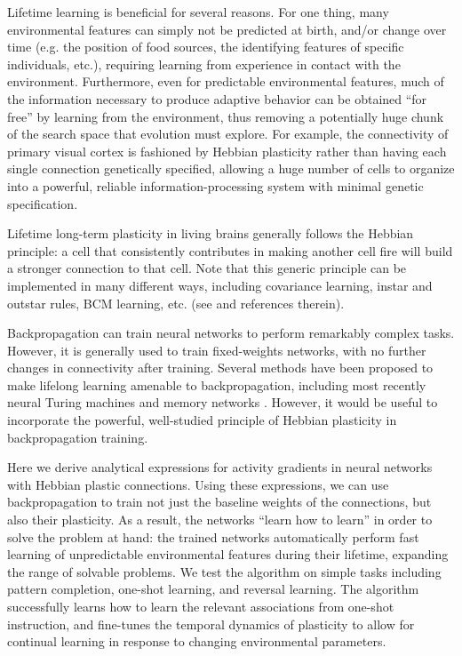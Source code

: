 \documentclass{article}
\begin{document}
Lifetime learning is beneficial for several reasons. For one thing,
many environmental features can simply not be predicted at birth, and/or change
over time (e.g. the
position of food sources, the identifying features of specific individuals, etc.), 
requiring learning from experience in contact with the
environment. Furthermore, even for predictable environmental features, much of
the information necessary to produce adaptive behavior can be obtained ``for
free'' by learning from the environment, thus removing a potentially huge chunk
of the search space that evolution must explore. For example, the connectivity
of primary visual cortex is fashioned by Hebbian plasticity rather than having
each single connection genetically specified, allowing a huge number of cells
to organize into a powerful, reliable information-processing system with
minimal genetic specification.

Lifetime long-term plasticity in living brains generally follows the Hebbian principle: a
cell that consistently contributes in making another cell fire will build a
stronger connection to that cell. Note that this generic principle can be
implemented in many different ways, including covariance learning, instar and
outstar rules, BCM learning, etc. (see \cite{Vasilkoski2011-ww} and references therein). 

Backpropagation can train neural networks to perform remarkably complex
tasks. However, it is generally used to train fixed-weights networks, with no further changes in connectivity after training. 
Several
methods have been proposed to make lifelong learning amenable to
backpropagation, including most recently neural Turing machines
\cite{Graves2014-ch,Santoro2016-jn} and
memory networks \cite{Sukhbaatar2015-ly}. However, it would be useful to incorporate the powerful, well-studied
principle of Hebbian plasticity in backpropagation
training.

Here we derive analytical expressions for activity gradients in neural networks with
Hebbian plastic connections. Using these expressions, we can use backpropagation
to train not just the baseline weights of the connections, but also their
plasticity. As a result, the networks ``learn how to learn''  in order to solve
the problem at hand: the trained networks automatically perform fast learning of
unpredictable environmental features during their lifetime, expanding the range
of solvable problems. We test the algorithm on simple tasks including pattern
completion, one-shot learning, and reversal learning.  The algorithm
successfully learns how to learn the relevant associations from one-shot
instruction, and fine-tunes the temporal dynamics of plasticity to allow for
continual learning in response to changing environmental parameters. 
\end{document}
